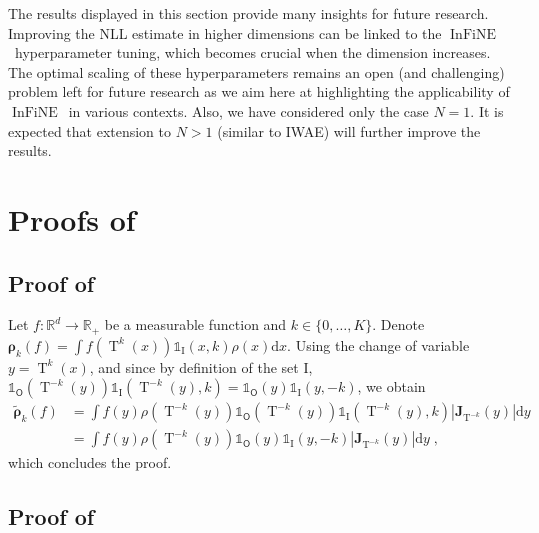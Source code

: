 \documentclass{article}
\def\IFIS{\ensuremath{\operatorname{InFiNE}}}
\def\InFiNE{{\small \IFIS}}
\def\transfo{\operatorname{T}}
\def\rmd{\operatorname{d}\hspace{-2pt}}
\def\rset{\mathbb{R}}
\def\dummy{f}
\def\nmeasrho{\tilde{\measrho}}
\def\rmd{\mathrm{d}}
\def\eqsp{\,}
\def\eqsp{\;}
\newcommand{\1}{\mathds{1}}
\newcommand{\indi}[1]{\1_{#1}}
\def\Jac{\mathbf{J}}
\newcommand{\JacOp}[1]{\Jac_{#1}}
\def\measrho{\boldsymbol{\rho}}
\def\rmi{\mathrm{I}}
\def\measprop{\boldsymbol{\rho}}
\def\mso{\mathsf{O}}
\def\rset{\mathbb{R}}
\def\rmd{\mathrm{d}}
\begin{document}
The results displayed in this section provide many insights for future research. Improving the NLL estimate in higher dimensions  can be linked to the \InFiNE\ hyperparameter tuning, which becomes crucial when the dimension increases. The optimal scaling of these hyperparameters remains an open (and challenging) problem left for future research as we aim here at highlighting the applicability  of \InFiNE\ in various contexts.  
Also, we have considered only the case $N=1$. It is expected that extension to $N > 1$ (similar to IWAE) will further improve the results.

\appendix

\section{Proofs of }
\label{sec:proof:infine}

\subsection{Proof of }

  Let $f:\rset^d\to\rset_+$ be a measurable function and
  $k \in \{0,\dots,K\}$.  Denote
  $\measprop_{k}(f)= \int \dummy(\transfo^{k}(x)) \indi{\rmi}(x,k)\rho(x)\rmd x$.
Using the change of variable $y = \transfo^{k}(x)$,
and since by definition of the set $\rmi$,
$\indi{\mso}(\transfo^{-k}(y)) \indi{\rmi}(\transfo^{-k}(y),k) =
\indi{\mso}(y) \indi{\rmi}(y,-k)$, we obtain
\begin{align*}
  \nmeasrho_{k}(f) &=
                       \int \dummy(y) \rho(\transfo^{-k}(y)) \indi{\mso}(\transfo^{-k}(y)) \indi{\rmi}(\transfo^{-k}(y),k) |\JacOp{\transfo^{-k}}(y)|\rmd y\\
                       &= \int\dummy(y) \rho(\transfo^{-k}(y)) \indi{\mso}(y) \indi{\rmi}(y,-k) |\JacOp{\transfo^{-k}}(y)|\rmd y\eqsp, 
\end{align*}
which concludes the proof.


\subsection{Proof of }
\end{document}
